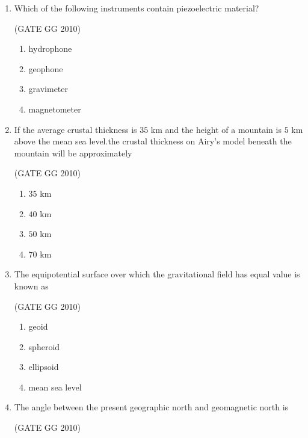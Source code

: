 \documentclass[journal]{IEEEtran}
\begin{document}
\begin{enumerate}
\item  Which of the following instruments contain piezoelectric material?

\hfill (GATE GG 2010)
\begin{multicols}{2}

\begin{enumerate}
\item hydrophone
\item geophone
\item gravimeter
\item magnetometer
\end{enumerate}
\end{multicols}


\item  If the average crustal thickness is $35$ km and the height of a mountain is $5$ km above the mean sea level.the crustal thickness on Airy's  model beneath the mountain will be approximately

\hfill (GATE GG 2010)
\begin{multicols}{4}

\begin{enumerate}

\item $35$ km
\item $40$ km
\item $50$ km
\item $70$ km
\end{enumerate}
\end{multicols}

\item The equipotential surface over which the gravitational field has equal value is known as 

\hfill (GATE GG 2010) 
\begin{multicols}{2}

\begin{enumerate}
\item geoid
\item spheroid
\item ellipsoid
\item mean sea level
\end{enumerate} 
\end{multicols}

\item The angle between the present geographic north and geomagnetic north is

\hfill (GATE GG 2010) 
\begin{multicols}{4}


\end{multicols}
\end{enumerate}
\end{document}
